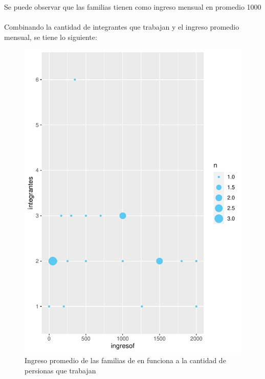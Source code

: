 \documentclass[12pt]{article}\usepackage[]{graphicx}\usepackage[]{xcolor}
\makeatletter
\def\maxwidth{ %
  \ifdim\Gin@nat@width>\linewidth
    \linewidth
  \else
    \Gin@nat@width
  \fi
}
\newenvironment{kframe}{%
 \def\at@end@of@kframe{}%
 \ifinner\ifhmode%
  \def\at@end@of@kframe{\end{minipage}}%
  \begin{minipage}{\columnwidth}%
 \fi\fi%
 \def\FrameCommand##1{\hskip\@totalleftmargin \hskip-\fboxsep
 \colorbox{shadecolor}{##1}\hskip-\fboxsep
     \hskip-\linewidth \hskip-\@totalleftmargin \hskip\columnwidth}%
 \MakeFramed {\advance\hsize-\width
   \@totalleftmargin\z@ \linewidth\hsize
   \@setminipage}}%
 {\par\unskip\endMakeFramed%
 \at@end@of@kframe}
\newenvironment{knitrout}{}{} %
\makeatother
\begin{document}
	Se puede observar que las familias tienen como ingreso mensual en promedio 1000\\
	\\
	Combinando la cantidad de integrantes que trabajan y el ingreso promedio mensual, se tiene lo siguiente:
	
	\begin{figure}[H]
	\centering
\begin{knitrout}
\color{fgcolor}\begin{kframe}


{\ttfamily\noindent\color{warningcolor}{\#\# Warning: NAs introducidos por coerción}}

{\ttfamily\noindent\color{warningcolor}{\#\# Warning: Removed 15 rows containing non-finite values (`stat\_sum()`).}}\end{kframe}
\includegraphics[width=\maxwidth]{figure/nose-1} 
\end{knitrout}
	\caption{Ingreso promedio de las familias de \comunidad en funciona a la cantidad de persionas que trabajan}
	\end{figure}
\end{document}
